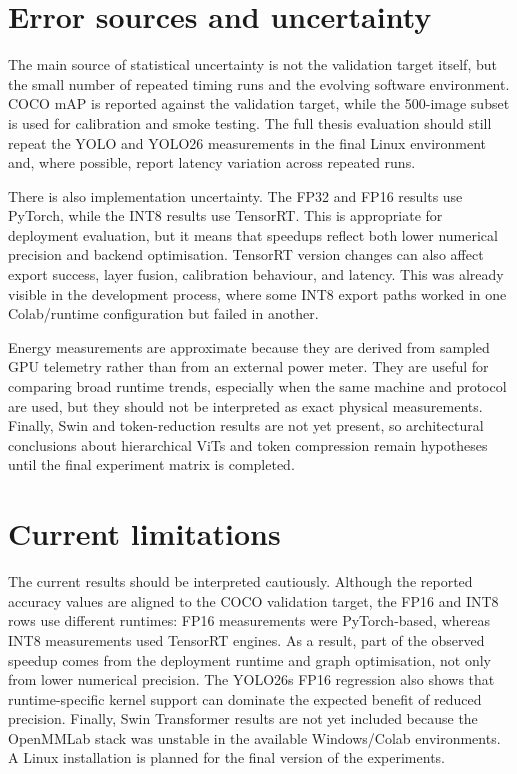 \documentclass[a4paper,11pt,twoside]{report}
\theoremstyle{definition}
\begin{document}
\section{Error sources and uncertainty}

The main source of statistical uncertainty is not the validation target itself, but the small number of repeated timing runs and the evolving software environment. COCO mAP is reported against the validation target, while the 500-image subset is used for calibration and smoke testing. The full thesis evaluation should still repeat the YOLO and YOLO26 measurements in the final Linux environment and, where possible, report latency variation across repeated runs.

There is also implementation uncertainty. The FP32 and FP16 results use PyTorch, while the INT8 results use TensorRT. This is appropriate for deployment evaluation, but it means that speedups reflect both lower numerical precision and backend optimisation. TensorRT version changes can also affect export success, layer fusion, calibration behaviour, and latency. This was already visible in the development process, where some INT8 export paths worked in one Colab/runtime configuration but failed in another.

Energy measurements are approximate because they are derived from sampled GPU telemetry rather than from an external power meter. They are useful for comparing broad runtime trends, especially when the same machine and protocol are used, but they should not be interpreted as exact physical measurements. Finally, Swin and token-reduction results are not yet present, so architectural conclusions about hierarchical ViTs and token compression remain hypotheses until the final experiment matrix is completed.

\section{Current limitations}

The current results should be interpreted cautiously. Although the reported accuracy values are aligned to the COCO validation target, the FP16 and INT8 rows use different runtimes: FP16 measurements were PyTorch-based, whereas INT8 measurements used TensorRT engines. As a result, part of the observed speedup comes from the deployment runtime and graph optimisation, not only from lower numerical precision. The YOLO26s FP16 regression also shows that runtime-specific kernel support can dominate the expected benefit of reduced precision. Finally, Swin Transformer results are not yet included because the OpenMMLab stack was unstable in the available Windows/Colab environments. A Linux installation is planned for the final version of the experiments.
\end{document}
